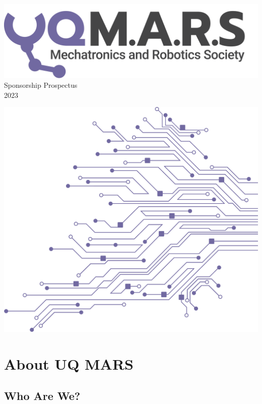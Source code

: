\documentclass[a4paper,12pt]{report}
\begin{document}
\begin{titlepage}
    \begin{center}
        \vspace*{15mm}
        \includegraphics[width=0.7\paperwidth]{Assets/Logo (Dark).png} \\
        \vspace{1cm}
        \Huge Sponsorship Prospectus \\
        \huge \textcolor{turbo_purple}{2023}
    \end{center}
    \vfill
    \includegraphics[height=0.5\paperheight, right]{Assets/Pattern - PCB (Solid).png}
    \vspace*{10mm}
\end{titlepage}
\restoregeometry

\section*{About UQ MARS}
\subsection*{Who Are We?}
\end{document}
